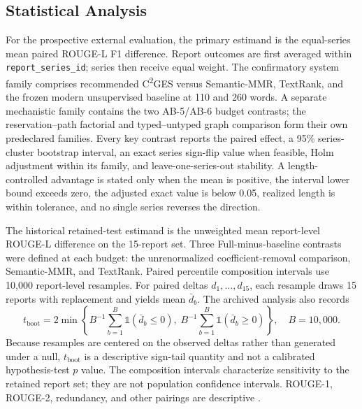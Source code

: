 \documentclass[applsci,article,submit,moreauthors]{Definitions/mdpi}
\newcommand{\cges}{C\textsuperscript{2}GES}
\begin{document}
\subsection{Statistical Analysis}

For the prospective external evaluation, the primary estimand is the equal-series mean paired ROUGE-L F1 difference. Report outcomes are first averaged within \texttt{report\_series\_id}; series then receive equal weight. The confirmatory system family comprises recommended \cges{} versus Semantic-MMR, TextRank, and the frozen modern unsupervised baseline at 110 and 260 words. A separate mechanistic family contains the two AB-5/AB-6 budget contrasts; the reservation--path factorial and typed--untyped graph comparison form their own predeclared families. Every key contrast reports the paired effect, a 95\% series-cluster bootstrap interval, an exact series sign-flip value when feasible, Holm adjustment within its family, and leave-one-series-out stability. A length-controlled advantage is stated only when the mean is positive, the interval lower bound exceeds zero, the adjusted exact value is below 0.05, realized length is within tolerance, and no single series reverses the direction.

The historical retained-test estimand is the unweighted mean report-level ROUGE-L difference on the 15-report set. Three Full-minus-baseline contrasts were defined at each budget: the unrenormalized coefficient-removal comparison, Semantic-MMR, and TextRank. Paired percentile composition intervals use 10,000 report-level resamples. For paired deltas $d_1,\ldots,d_{15}$, each resample draws 15 reports with replacement and yields mean $\bar d_b$. The archived analysis also records
\begin{equation}
t_{\mathrm{boot}}=2\min\left\{B^{-1}\sum_{b=1}^{B}\mathbb{1}(\bar d_b\leq0),\;B^{-1}\sum_{b=1}^{B}\mathbb{1}(\bar d_b\geq0)\right\},\quad B=10{,}000.
\end{equation}
Because resamples are centered on the observed deltas rather than generated under a null, $t_{\mathrm{boot}}$ is a descriptive sign-tail quantity and not a calibrated hypothesis-test $p$ value. The composition intervals characterize sensitivity to the retained report set; they are not population confidence intervals. ROUGE-1, ROUGE-2, redundancy, and other pairings are descriptive \cite{cameron2008bootstrap}.
\end{document}
